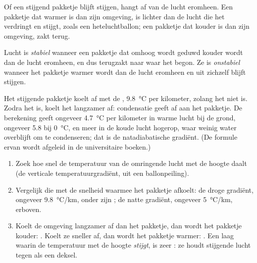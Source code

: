 Of een stijgend pakketje blijft stijgen, hangt af van de lucht eromheen. Een
pakketje dat warmer is dan zijn omgeving, is lichter dan de lucht die het
verdringt en stijgt, zoals een heteluchtballon; een pakketje dat kouder is dan
zijn omgeving, zakt terug.

\begin{definition}\label{def:g10:why-clouds-form:stability}
Lucht is \emph{stabiel} wanneer een pakketje dat omhoog
wordt geduwd kouder wordt dan de lucht eromheen, en dus terugzakt naar waar het
begon. Ze is \emph{onstabiel} wanneer het pakketje warmer
wordt dan de lucht eromheen en uit zichzelf blijft stijgen.
\end{definition}

Het stijgende pakketje koelt af met de ,
\qty{9.8}{\degreeCelsius} per kilometer, zolang het niet  is. Zodra het
 is, koelt het langzamer af: condensatie geeft  af aan het
pakketje. De berekening geeft ongeveer \qty{4.7}{\degreeCelsius} per kilometer in
warme lucht bij de grond, ongeveer \num{5.8} bij \qty{0}{\degreeCelsius}, en meer
in de koude lucht hogerop, waar weinig water overblijft om te condenseren; dat
is de natadiabatische gradiënt. (De formule ervan wordt afgeleid in de
universitaire boeken.)

\begin{method}\label{met:g10:why-clouds-form:stable}
\begin{enumerate}
  \item Zoek hoe snel de temperatuur van de omringende lucht met de hoogte daalt
        (de verticale temperatuurgradiënt, uit een ballonpeiling).
  \item Vergelijk die met de snelheid waarmee het pakketje afkoelt: de droge
        gradiënt, ongeveer \qty{9.8}{\degreeCelsius/km}, onder zijn
        ; de natte gradiënt, ongeveer
        \qty{5}{\degreeCelsius/km}, erboven.
  \item Koelt de omgeving langzamer af dan het pakketje, dan wordt het pakketje
        kouder: . Koelt ze sneller af, dan wordt het pakketje warmer:
        . Een laag waarin de temperatuur met de hoogte \emph{stijgt},
        is zeer : ze houdt stijgende lucht tegen als een deksel.
\end{enumerate}
\end{method}

